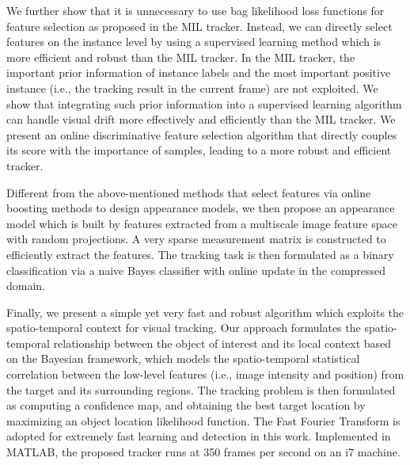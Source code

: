 \documentclass[12pt,oneside]{report}
\numberwithin{figure}{chapter}
\newenvironment{preliminary}%
{\pagestyle{plain}\pagenumbering{roman}}%
{\pagenumbering{arabic}}
\begin{document}
\begin{preliminary}
%
We further show that it is unnecessary to use bag likelihood loss functions for feature selection as proposed in the MIL tracker. Instead, we can directly select features on the instance level by using a supervised learning method which is more efficient and robust than the MIL tracker. In the MIL tracker, the important prior information of instance labels and the most important positive instance (i.e., the tracking result in the current frame) are not exploited. We show that integrating such prior information into a
supervised learning algorithm can handle visual drift more effectively and efficiently than the MIL tracker. We present an online discriminative feature selection algorithm that directly couples its score with the importance of samples, leading to a more robust and efficient tracker.
%

%
Different from the above-mentioned methods that select features via online boosting methods to design appearance models, we then propose an appearance model which is built by features extracted from a multiscale image feature space with random projections. A very sparse measurement matrix is constructed to efficiently extract the features. The tracking task is then formulated as a binary classification via a naive Bayes classifier with online update in the compressed domain.

%
Finally, we present a simple yet very fast and robust
algorithm which exploits the spatio-temporal context for visual
tracking.
%
Our approach formulates the spatio-temporal relationship
between the object of interest and its local context based on the
Bayesian framework, which models the spatio-temporal statistical
correlation between the low-level features (i.e., image intensity and
position) from the target and its surrounding regions.
%
The tracking problem is then
formulated as computing a confidence map, and obtaining the best
target location by maximizing an object location likelihood
function.
%
The Fast Fourier Transform is adopted for extremely fast
learning and detection in this work.
%
Implemented in MATLAB,
the proposed tracker runs at 350 frames per second on an i7
machine.
%


\end{preliminary}
\end{document}
